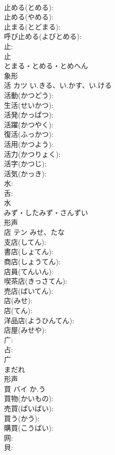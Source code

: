 \documentclass[8pt]{extreport}
\begin{document}
\begin{CJK}{UTF8}{min}
\\	止める(とめる): 
\\	止める(やめる): 
\\	止まる(とどまる): 
\\	呼び止める(よびとめる): 
\\	止: 
\\	止	
\\	とまる・とめる・とめへん	
\\	象形 
\\	活	カツ	い.きる、い.かす、い.ける		
\\	活動(かつどう): 
\\	生活(せいかつ): 
\\	活発(かっぱつ): 
\\	活躍(かつやく): 
\\	復活(ふっかつ): 
\\	活用(かつよう): 
\\	活力(かつりょく): 
\\	活字(かつじ): 
\\	活気(かっき): 
\\	水: 
\\	舌: 
\\	水	
\\	みず・したみず・さんずい	
\\	形声 
\\	店	テン	みせ、たな		
\\	支店(してん): 
\\	書店(しょてん): 
\\	商店(しょうてん): 
\\	店員(てんいん): 
\\	喫茶店(きっさてん): 
\\	売店(ばいてん): 
\\	店(みせ): 
\\	店(てん): 
\\	洋品店(ようひんてん): 
\\	店屋(みせや): 
\\	广: 
\\	占: 
\\	广	
\\	まだれ	
\\	形声 
\\	買	バイ	か.う		
\\	買物(かいもの): 
\\	売買(ばいばい): 
\\	買う(かう): 
\\	購買(こうばい): 
\\	网: 
\\	貝: 

\end{CJK}
\end{document}
